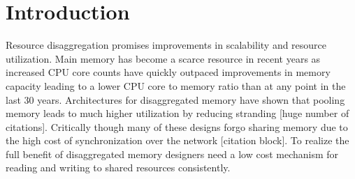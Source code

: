 \section{Introduction}
\label{sec:intro}




Resource disaggregation promises improvements in scalability and resource utilization. Main memory
has become a scarce resource in recent years as increased CPU core counts have quickly outpaced
improvements in memory capacity leading to a lower CPU core to memory ratio than at any point in the
last 30 years. Architectures for disaggregated memory have shown that pooling memory leads to much
higher utilization by reducing stranding [huge number of citations]. Critically though many of these
designs forgo sharing memory due to the high cost of synchronization over the network [citation
block]. To realize the full benefit of disaggregated memory designers need a low cost mechanism for
reading and writing to shared resources consistently.

